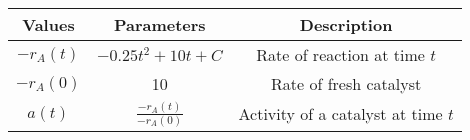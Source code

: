 
\begin{tabular}{|c|c|c|}
\hline
\textbf{Values} & \textbf{Parameters} & \textbf{Description} \\
\hline
$-r_A(t)$ & $-0.25t^2 + 10t + C$ & Rate of reaction at time $t$  \\
\hline
$-r_A(0)$ & 10  & Rate of fresh catalyst  \\
\hline
$a(t)$ & $\frac{-r_A(t)}{-r_A(0)}$ & Activity of a catalyst at time $t$ \\
\hline
\end{tabular}




